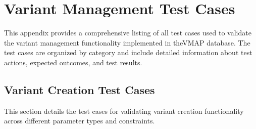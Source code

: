 \chapter{Variant Management Test Cases}
\label{appendix:variant-management-tests}

This appendix provides a comprehensive listing of all test cases used to validate the variant management functionality implemented in the\ac{VMAP} database. The test cases are organized by category and include detailed information about test actions, expected outcomes, and test results.

\section{Variant Creation Test Cases}
\label{sec:variant-creation-tests}

This section details the test cases for validating variant creation functionality across different parameter types and constraints.

